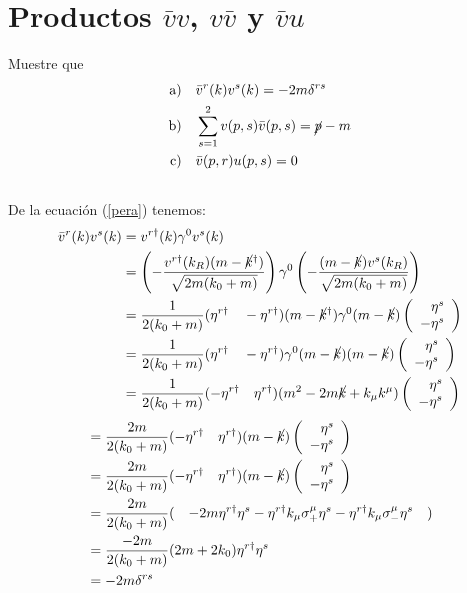 \section{Productos $\bar vv$, $v\bar v$ y $\bar vu$}
\begingroup\color{blue}
Muestre que
\begin{equation}
\begin{split}
\text{a)}\quad&\bar v^r(k)v^s(k)=-2m\delta^{rs}\\
\text{b)}\quad&\sum_{s=1}^2v(p,s)\bar v(p,s)=\cancel p-m\\
\text{c)}\quad&\bar v(p,r)u(p,s)=0
\end{split}
\end{equation}
\endgroup
\subsection{}
De la ecuación (\ref{pera}) tenemos:
\begin{equation*}\begin{split}
\bar v^r(k)v^s(k)&=v^{r\dagger}(k)\gamma^0v^s(k)\\
&=
\left(
-\frac{v^{r\dagger}(k_R)(m-\ck^\dagger)}{\sqrt{2m(k_0+m)}}
\right)\gamma^0
\left(
-\frac{(m-\ck)v^s(k_R)}{\sqrt{2m(k_0+m)}}
\right)\\
&=\frac1{2(k_0+m)}(\eta^{r\dagger}\quad-\eta^{r\dagger})
(m-\ck^\dagger)\gamma^0(m-\ck)
\left(\begin{array}r
\eta^s\\-\eta^s
\end{array}\right)\\
&=\frac1{2(k_0+m)}(\eta^{r\dagger}\quad-\eta^{r\dagger})\gamma^0
(m-\ck)(m-\ck)
\left(\begin{array}r
\eta^s\\-\eta^s
\end{array}\right)\\
&=\frac1{2(k_0+m)}(-\eta^{r\dagger}\quad\eta^{r\dagger})
(m^2-2m\ck+k_\mu k^\mu)
\left(\begin{array}r
\eta^s\\-\eta^s
\end{array}\right)
\end{split}\end{equation*}
\begin{equation}\begin{split}
&=\frac{2m}{2(k_0+m)}(-\eta^{r\dagger}\quad\eta^{r\dagger})
(m-\ck)
\left(\begin{array}r
\eta^s\\-\eta^s
\end{array}\right)\\
&=\frac{2m}{2(k_0+m)}(-\eta^{r\dagger}\quad\eta^{r\dagger})
(m-\ck)
\left(\begin{array}r
\eta^s\\-\eta^s
\end{array}\right)\\
&=\frac{2m}{2(k_0+m)}(\quad
-2m\eta^{r\dagger}\eta^s
-\eta^{r\dagger}k_\mu\sigma_+^\mu\eta^s
-\eta^{r\dagger}k_\mu\sigma_-^\mu\eta^s\quad)\\
&=\frac{-2m}{2(k_0+m)}(2m+2k_0)\eta^{r\dagger}\eta^s\\
&=-2m\delta^{rs}
\end{split}\end{equation}
